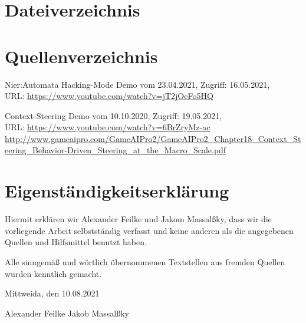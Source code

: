 \documentclass[a4paper,10pt,ngerman,fontsize=12pt]{scrreprt}
\begin{document}
\chapter{Dateiverzeichnis}




\chapter{Quellenverzeichnis}

\begin{thebibliography}{999}

 Nier:Automata Hacking-Mode Demo vom 23.04.2021,  Zugriff:  16.05.2021, \\ URL:
\url{https://www.youtube.com/watch?v=jT2jOeFo5HQ}

 Context-Steering Demo vom 10.10.2020,  Zugriff:  19.05.2021, \\ URL:
\url{https://www.youtube.com/watch?v=6BrZryMz-ac}
\url{http://www.gameaipro.com/GameAIPro2/GameAIPro2_Chapter18_Context_Steering_Behavior-Driven_Steering_at_the_Macro_Scale.pdf}

\end{thebibliography}
    




\chapter{Eigenständigkeitserklärung}

Hiermit erklären wir Alexander Feilke und Jakom Massal{\ss}ky, dass wir die vorliegende Arbeit selbstständig verfasst und keine anderen als die angegebenen Quellen und Hilfsmittel benutzt haben.

Alle sinngemä{\ss} und wörtlich übernommenen Textstellen aus fremden Quellen wurden kenntlich gemacht.

Mittweida, den 10.08.2021

\vspace{2cm}

Alexander Feilke \hspace{4cm} Jakob Massal{\ss}ky
\end{document}

